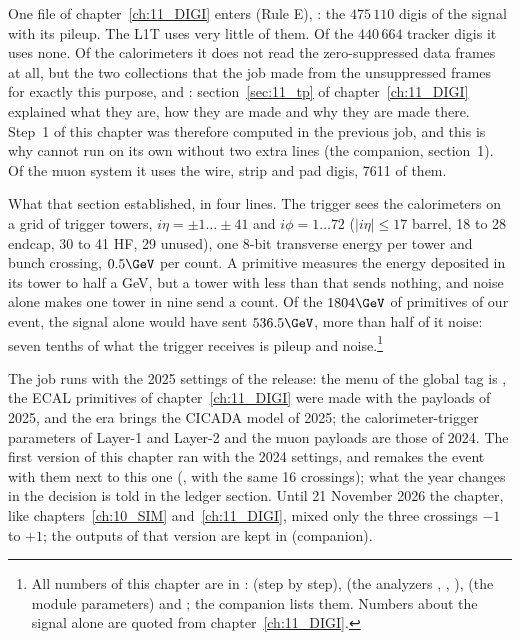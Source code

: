 One file of chapter~\ref{ch:11_DIGI} enters (Rule E), : the
$475\,110$ digis of the signal with its pileup. The L1T uses very little of them. Of the $440\,664$ tracker digis it
uses none. Of the calorimeters it does not read the zero-suppressed data frames at all, but the two collections
that the  job made from the unsuppressed frames for exactly this purpose,
 and : section~\ref{sec:11_tp} of
chapter~\ref{ch:11_DIGI} explained what they are, how they are made and why they are made there. Step~1 of this
chapter was therefore computed in the previous job, and this is why  cannot run on its own without two
extra lines (the companion, section~1). Of the muon system it uses the wire, strip and pad digis, 7611 of them.

What that section established, in four lines. The trigger sees the calorimeters on a grid of trigger towers,
$i\eta=\pm1\ldots\pm41$ and $i\phi=1\ldots72$ ($|i\eta|\leq17$ barrel, 18 to 28 endcap, 30 to 41 HF, 29 unused),
one 8-bit transverse energy per tower and bunch crossing, $0.5\GeV$ per count. A primitive measures the energy
deposited in its tower to half a GeV, but a tower with less than that sends nothing, and noise alone makes one
tower in nine send a count. Of the $1804\GeV$ of primitives of our event, the signal alone would have sent
$536.5\GeV$, more than half of it noise: seven tenths of what the trigger receives is pileup and noise.\footnote{All numbers of this chapter are in
:  (step by step),  (the analyzers
, , ),  (the module
parameters) and ; the companion lists them. Numbers about the signal alone are quoted from
chapter~\ref{ch:11_DIGI}.}

The job runs with the 2025 settings of the release: the menu of the global tag is
, the ECAL primitives of chapter~\ref{ch:11_DIGI} were made with the payloads of 2025, and the era 
brings the CICADA model of 2025; the calorimeter-trigger parameters of Layer-1 and Layer-2 and the muon payloads are
those of 2024. The first version of this chapter ran with the 2024 settings, and
 remakes the event with them next to this one (, with
the same 16 crossings); what the year changes in the decision is told in the ledger section. Until 21 November 2026
the chapter, like chapters~\ref{ch:10_SIM} and~\ref{ch:11_DIGI}, mixed only the three crossings $-1$ to $+1$; the
outputs of that version are kept in  (companion).

